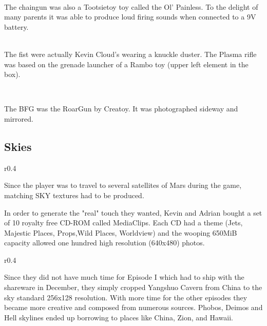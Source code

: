 \\
\par

The chaingun was also a Tootsietoy toy called the Ol' Painless. To the delight of many parents it was able to produce loud firing sounds when connected to a 9V battery.

\par
{}\\


The fist were actually Kevin Cloud's wearing a knuckle duster. The Plasma rifle was based on the grenade launcher of a Rambo toy (upper left element in the box).
\par
{}\\
\par
The BFG was the RoarGun by Creatoy. It was photographed sideway and mirrored.\\
\par
{}
\pagebreak


\subsection{Skies}
\begin{wrapfigure}[7]{r}{0.4\textwidth}
\centering
{}
\end{wrapfigure}
Since the player was to travel to several satellites of Mars during the game, matching SKY textures had to be produced.\\
\par In order to generate the "real" touch they wanted, Kevin and Adrian bought a set of 10 royalty free CD-ROM called MediaClips. Each CD had a theme (Jets, Majestic Places, Props,Wild Places, Worldview) and the wooping 650MiB capacity allowed one hundred high resolution (640x480) photos.\\
\par 

\begin{wrapfigure}[7]{r}{0.4\textwidth}
\centering
{}
\end{wrapfigure}

 Since they did not have much time for Episode I which had to ship with the shareware in December, they simply cropped Yangshuo Cavern from China to the sky standard 256x128 resolution.  With more time for the other episodes they became more creative and composed from numerous sources. Phobos, Deimos and Hell skylines ended up borrowing to places like China, Zion, and Hawaii. \\
\par

